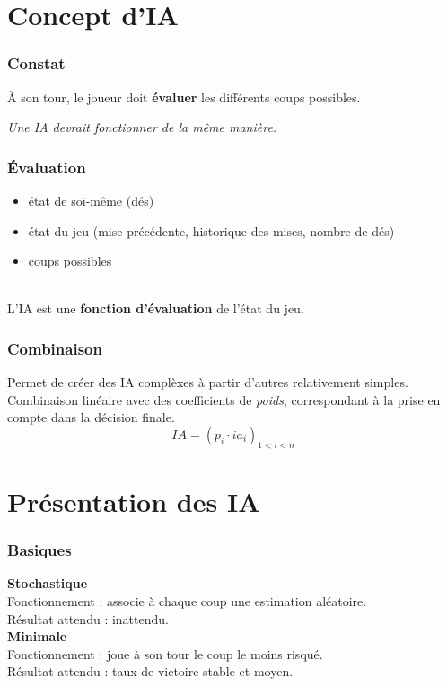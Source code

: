 \documentclass{beamer}
\begin{document}
\section{Concept d'IA}

\begin{frame}
  \frametitle{Constat}

  À son tour, le joueur doit \textbf{évaluer} les différents coups possibles.
  \\[1.5cm]
  \begin{center}
    \textit{Une IA devrait fonctionner de la même manière.}
  \end{center}
\end{frame}

\begin{frame}
  \frametitle{Évaluation}

  \begin{itemize}
    \item état de soi-même (dés)
    \item état du jeu (mise précédente, historique des mises, nombre de dés)
    \item coups possibles
  \end{itemize}

  \\[1cm]
  \large L'IA est une \textbf{fonction d'évaluation} de l'état du jeu.
\end{frame}

\begin{frame}
  \frametitle{Combinaison}

  \begin{large}
    Permet de créer des IA complèxes à partir d'autres relativement simples.
    \\[1cm]
    Combinaison linéaire avec des coefficients de \emph{poids}, correspondant à
    la prise en compte dans la décision finale.
    $$
    IA = \left( p_i \cdot ia_i \right)_{1<i<n}
    $$
  \end{large}
\end{frame}

\section{Présentation des IA}

\begin{frame}
  \frametitle{Basiques}

  \textbf{Stochastique}
  \\
  Fonctionnement : associe à chaque coup une estimation aléatoire.
  \\
  Résultat attendu : inattendu.
  \\[1cm]
  \textbf{Minimale}
  \\
  Fonctionnement : joue à son tour le coup le moins risqué.
  \\
  Résultat attendu : taux de victoire stable et moyen.
\end{frame}
\end{document}
